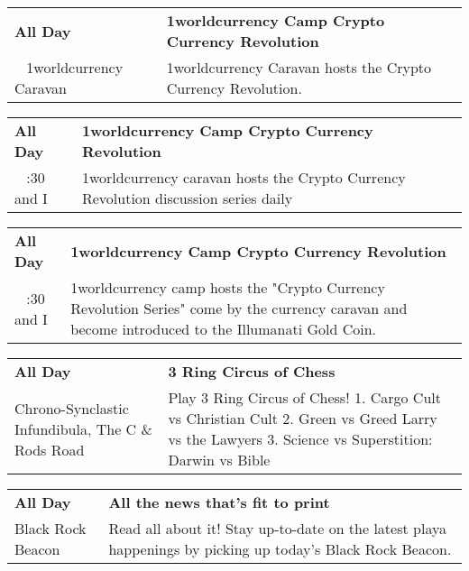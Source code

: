
\tiny{}

\begin{tabular}{ p{1in} p{2.2in} }
    \textbf{All Day} & \textbf{1worldcurrency Camp Crypto Currency Revolution} \\
    ~ \newline 1worldcurrency Caravan & 1worldcurrency Caravan hosts the Crypto Currency Revolution. \\
    \hline 
\end{tabular}
    
\begin{tabular}{ p{1in} p{2.2in} }
    \textbf{All Day} & \textbf{1worldcurrency Camp Crypto Currency Revolution} \\
    ~ \newline 7:30 and I & 1worldcurrency caravan hosts the Crypto Currency Revolution discussion series daily \\
    \hline 
\end{tabular}
    
\begin{tabular}{ p{1in} p{2.2in} }
    \textbf{All Day} & \textbf{1worldcurrency Camp Crypto Currency Revolution} \\
    ~ \newline 7:30 and I & 1worldcurrency camp hosts the "Crypto Currency Revolution Series" come by the currency caravan and become introduced to the Illumanati Gold Coin. \\
    \hline 
\end{tabular}
    
\begin{tabular}{ p{1in} p{2.2in} }
    \textbf{All Day} & \textbf{3 Ring Circus of Chess } \\
    Chrono-Synclastic Infundibula, The \newline C \& Rods Road & Play 3 Ring Circus of Chess!
1. Cargo Cult vs Christian Cult 
2. Green vs Greed
Larry vs the Lawyers
3. Science vs Superstition:
Darwin vs Bible \\
    \hline 
\end{tabular}
    
\begin{tabular}{ p{1in} p{2.2in} }
    \textbf{All Day} & \textbf{All the news that's fit to print} \\
    Black Rock Beacon \newline  & Read all about it! Stay up-to-date on the latest playa happenings by picking up today's Black Rock Beacon. \\
    \hline 
\end{tabular}
    
